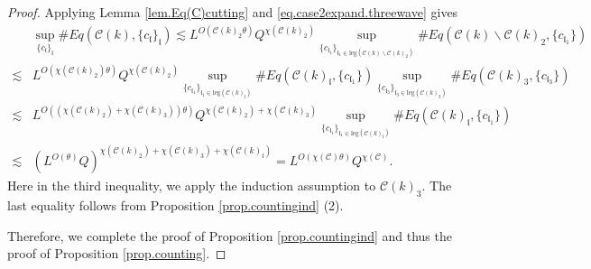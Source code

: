 \begin{proof}
Applying Lemma \ref{lem.Eq(C)cutting} and \eqref{eq.case2expand.threewave} gives
\begin{equation}\label{eq.case2expand'.threewave}
\begin{split}
    &\sup_{\{c_{\mathfrak{l}}\}_{\mathfrak{l}}}\#Eq(\mathcal{C}(k),\{c_{\mathfrak{l}}\}_{\mathfrak{l}})
    \lesssim  L^{O(\mathcal{C}(k)_2\theta)} Q^{\chi(\mathcal{C}(k)_2)}\sup_{\{c_{\mathfrak{l}_1}\}_{\mathfrak{l}_1\in \text{leg}(\mathcal{C}(k)\backslash\mathcal{C}(k)_2)} } \# Eq(\mathcal{C}(k)\backslash\mathcal{C}(k)_2,\{c_{\mathfrak{l}_1}\})
    \\
    \lesssim& L^{O(\chi(\mathcal{C}(k)_2)\theta)} Q^{\chi(\mathcal{C}(k)_2)}\sup_{\{c_{\mathfrak{l}_1}\}_{\mathfrak{l}_1\in \text{leg}(\mathcal{C}(k)_{\mathfrak{l}})} } \# Eq(\mathcal{C}(k)_{\mathfrak{l}},\{c_{\mathfrak{l}_1}\}) \sup_{\{c_{\mathfrak{l}_3}\}_{\mathfrak{l}_3\in \text{leg}(\mathcal{C}(k)_{3})} }\# Eq(\mathcal{C}(k)_{3}, \{c_{\mathfrak{l}_3}\})
    \\
    \lesssim& L^{O((\chi(\mathcal{C}(k)_2)+\chi(\mathcal{C}(k)_3))\theta)} Q^{\chi(\mathcal{C}(k)_2)+\chi(\mathcal{C}(k)_3)}\sup_{\{c_{\mathfrak{l}_1}\}_{\mathfrak{l}_1\in \text{leg}(\mathcal{C}(k)_{\mathfrak{l}})} } \# Eq(\mathcal{C}(k)_{\mathfrak{l}},\{c_{\mathfrak{l}_1}\}) 
    \\
    \lesssim& (L^{O(\theta)} Q)^{\chi(\mathcal{C}(k)_2)+\chi(\mathcal{C}(k)_3)+\chi(\mathcal{C}(k)_{\mathfrak{l}})}=L^{O(\chi(\mathcal{C})\theta)} Q^{\chi(\mathcal{C})}.
\end{split}
\end{equation}
Here in the third inequality, we apply the induction assumption to $\mathcal{C}(k)_3$. The last equality follows from Proposition \ref{prop.countingind} (2).

Therefore, we complete the proof of Proposition \ref{prop.countingind}
and thus the proof of Proposition \ref{prop.counting}.
\end{proof}






























